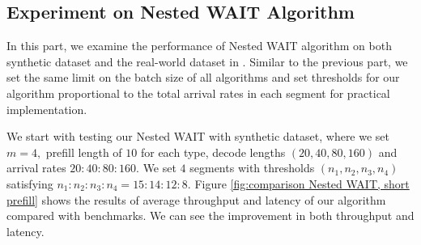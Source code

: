 



\subsection{Experiment on Nested WAIT Algorithm}
In this part, we examine the performance of Nested WAIT algorithm on both synthetic dataset and the real-world dataset in \cite{zheng2023lmsys}. Similar to the previous part, we set the same limit on the batch size of all algorithms and set thresholds for our algorithm proportional to the total arrival rates in each segment for practical implementation.

We start with testing our Nested WAIT with synthetic dataset, where we set $m=4,$ prefill length of $10$ for each type, decode lengths $(20,40,80,160)$ and arrival rates $20:40:80:160.$ We set $4$ segments with thresholds $(n_1,n_2,n_3,n_4)$ satisfying $n_1:n_2:n_3:n_4= 15:14:12:8.$ Figure \ref{fig:comparison Nested WAIT, short prefill} shows the results of average throughput and latency of our algorithm compared with benchmarks. We can see the improvement in both throughput and latency.

